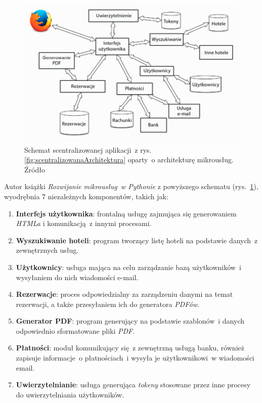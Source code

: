 \begin{figure}[h!]
	\centering
		\includegraphics[width=12cm]{Rysunki/Rozdzial1/mikrouslugi}
		\caption{Schemat scentralizowanej aplikacji~z rys. \ref{fig:scentralizowanaArchitektura} oparty~o architekturę mikrousług. Źródło \cite{Ziade:2018}}	
		\label{fig:mikrouslugi}
	\end{figure}
	
Autor książki \textit{Rozwijanie mikrousług~w Pythonie} z powyższego schematu (rys.~\ref{fig:mikrouslugi}), wyodrębnia 7 niezależnych komponentów\cite{Ziade:2018}, takich jak:

\begin{enumerate}
  \item \textbf{Interfejs użytkownika}: frontalną usługę zajmująca się generowaniem \textit{HTMLa} i komunikacją~z innymi procesami.
  \item \textbf{Wyszukiwanie hoteli}: program tworzący listę hoteli na podstawie danych~z zewnętrznych usług.
  \item \textbf{Użytkownicy}: usługa mająca na celu zarządzanie bazą użytkowników~i wysyłaniem do nich wiadomości e-mail.
  \item \textbf{Rezerwacje}: proces odpowiedzialny za zarządzeniu danymi na temat rezerwacji, a także przesyłaniem ich do generatora \textit{PDFów}.
  \item \textbf{Generator PDF}: program generujący na podstawie szablonów~i danych odpowiednio sformatowane pliki \textit{PDF}.
  \item \textbf{Płatności}: moduł komunikujący się~z zewnętrzną usługą banku, również zapisuje informacje~o płatnościach~i wysyła je użytkownikowi~w wiadomości email.
  \item \textbf{Uwierzytelnianie}: usługa generująca \textit{tokeny} stosowane przez inne procesy do uwierzytelniania użytkowników.
 \end{enumerate}
 
